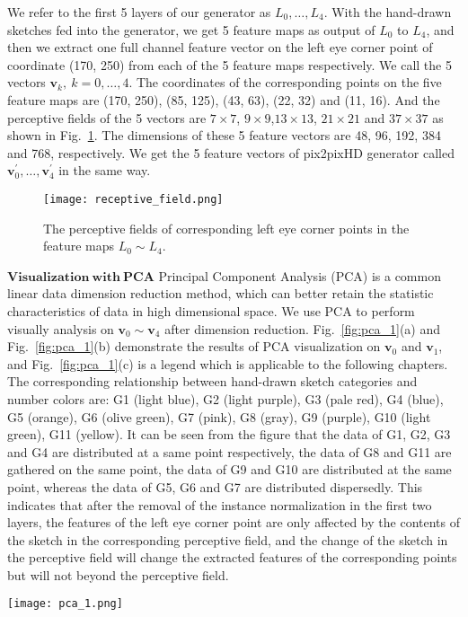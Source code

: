 \documentclass[10pt,twocolumn,letterpaper]{article}
\begin{document}
We refer to the first 5 layers of our generator as $L_0,\ldots,L_4$. With the hand-drawn sketches fed into the generator, we get 5 feature maps as output of $L_0$ to $L_4$, and then we extract one full channel feature vector on the left eye corner point of coordinate (170, 250) from each of the 5 feature maps respectively. We call the 5 vectors $\boldsymbol{v}_k,~k=0,\ldots,4$. The coordinates of the corresponding points on the five feature maps are (170, 250), (85, 125), (43, 63), (22, 32) and (11, 16). And the perceptive fields of the 5 vectors are $7\times7$, $9\times9$,$13\times13$, $21\times21$ and $37\times37$ as shown in Fig.~\ref{fig:receptive}. The dimensions of these 5 feature vectors are 48, 96, 192, 384 and 768, respectively. We get the 5 feature vectors of pix2pixHD generator called $\boldsymbol{v}_0^{'},\ldots,\boldsymbol{v}_4^{'}$ in the same way.
\begin{figure}[htbp]
	\begin{center}
	\texttt{[image: receptive\_field.png]}
	\end{center}
	\caption{The perceptive fields of corresponding left eye corner points in the feature maps $L_0\sim L_4$. }
	\label{fig:receptive}
\end{figure}

\noindent
$\mathbf{Visualization ~with ~PCA}$ Principal Component Analysis (PCA)\cite{pca} is a common linear data dimension reduction method, which can better retain the statistic characteristics of data in high dimensional space. We use PCA to perform visually analysis on $\boldsymbol{v}_0\sim \boldsymbol{v}_4$ after dimension reduction.
Fig.~\ref{fig:pca_1}(a) and Fig.~\ref{fig:pca_1}(b) demonstrate the results of PCA visualization on $\boldsymbol{v}_0$ and $\boldsymbol{v}_1$, and Fig.~\ref{fig:pca_1}(c) is a legend which is applicable to the following chapters. The corresponding relationship between hand-drawn sketch categories and number colors are: G1 (light blue), G2 (light purple), G3 (pale red), G4 (blue), G5 (orange), G6 (olive green), G7 (pink), G8 (gray), G9 (purple), G10 (light green), G11 (yellow).
It can be seen from the figure that the data of G1, G2, G3 and G4 are distributed at a same point respectively, the data of G8 and G11 are gathered on the same point, the data of G9 and G10 are distributed at the same point, whereas the data of G5, G6 and G7 are distributed dispersedly. 
This indicates that after the removal of the instance normalization in the first two layers, the features of the left eye corner point are only affected by the contents of the sketch in the corresponding perceptive field, and the change of the sketch in the perceptive field will change the extracted features of the corresponding points but will not beyond the perceptive field.
\begin{figure*}[htb]
	\centering
	\texttt{[image: pca\_1.png]}
	\caption{Results of PCA visualization on $\boldsymbol{v}_0$ and $\boldsymbol{v}_1$}
	\label{fig:pca_1}
\end{figure*}
\end{document}
